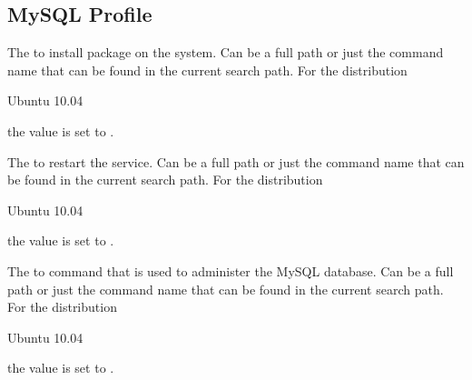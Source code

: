 \label{sec:mysql_profile}
\subsection{MySQL Profile}


The  to install package on the system. Can be a full path or
just the command name that can be found in the current search path. 
For the distribution
\begin{inparaitem}
\item[\TheDistribution{ubuntu}] Ubuntu 10.04
\end{inparaitem}
the value is set to .


The  to restart the service. Can be a full path or
just the command name that can be found in the current search path. 
For the distribution
\begin{inparaitem}
\item[\TheDistribution{ubuntu}] Ubuntu 10.04
\end{inparaitem}
the value is set to .


The  to  command that is used to administer the 
MySQL database. Can be a full path or
just the command name that can be found in the current search path. 
For the distribution
\begin{inparaitem}
\item[\TheDistribution{ubuntu}] Ubuntu 10.04
\end{inparaitem}
the value is set to .


